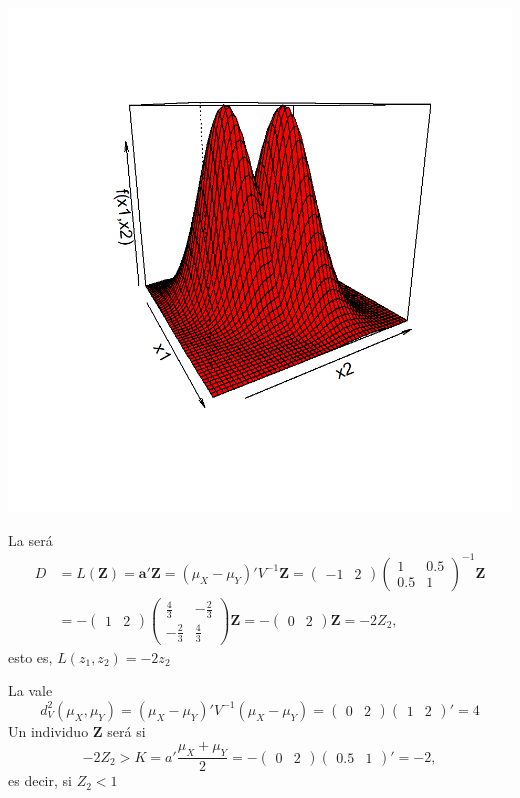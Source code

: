 \begin{flushright}
\includegraphics[width=0.6\linewidth]{"Temas/Imágenes/Tema 5/screenshot003"}
\end{flushright}

La  será \begin{align*}
D&=L(\mathbf{Z})=\mathbf{a'Z}=(\mu_X-\mu_Y)'V^{-1}\mathbf{Z}=\begin{pmatrix}
-1 & 2
\end{pmatrix}\begin{pmatrix}
1 & 0.5\\
0.5 & 1
\end{pmatrix}^{-1}\mathbf{Z}\\
&=-\begin{pmatrix}
1 & 2
\end{pmatrix}\begin{pmatrix}
\tfrac{4}{3} & -\tfrac{2}{3}\\
-\tfrac{2}{3} & \tfrac{4}{3}
\end{pmatrix}\mathbf{Z}=-\begin{pmatrix}
0 & 2
\end{pmatrix}\mathbf{Z}=-2Z_2,
\end{align*}esto es, $L(z_1,z_2)=-2z_2$

La  vale \[ d_V^2(\mu_X,\mu_Y)=(\mu_X-\mu_Y)'V^{-1}(\mu_X-\mu_Y)=\begin{pmatrix}
0 & 2
\end{pmatrix}\begin{pmatrix}
1 & 2
\end{pmatrix}'=4 \]
Un individuo \textbf{Z} será  si \[ -2Z_2>K=a'\dfrac{\mu_X+\mu_Y}{2}=-\begin{pmatrix}
0 & 2
\end{pmatrix}\begin{pmatrix}
0.5 & 1
\end{pmatrix}'=-2, \]es decir, si $Z_2<1$

